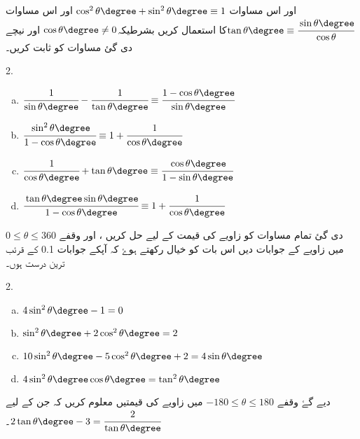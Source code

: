 \begin{enumerate}
                                                                                                                                                                                                                                                                                                                                                                                                                                                                                                                                   
\end{enumerate}

اور اس مساوات  \(\cos^2\theta\degree+\sin^2\theta\degree \equiv1\) اور اس مساوات \(\tan \theta\degree\equiv\cfrac{\sin\theta\degree}{\cos\theta}\)کا استعمال کریں بشرطیکہ\(\cos\theta\degree \neq 0 \) اور نیچے دی گئ مساوات کو ثابت کریں۔
\begin{multicols}{2.}
\begin{enumerate}[a.]
\item
\(\cfrac{1}{\sin\theta\degree}-\cfrac{1}{\tan\theta\degree}\equiv\cfrac{1-\cos\theta\degree}{\sin\theta\degree}\)
\item
 \(\cfrac{\sin^2\theta\degree}{1-\cos\theta\degree}\equiv 1+\cfrac{1}{\cos\theta\degree}\)
\item
\(\cfrac{1}{\cos\theta\degree}+\tan\theta\degree\equiv\cfrac{\cos\theta\degree}{1-\sin\theta\degree} \)
\item
\(\cfrac{\tan\theta\degree\sin\theta\degree}{1-\cos\theta\degree}\equiv1+\cfrac{1}{\cos\theta\degree} \)
\end{enumerate}
\end{multicols}
دی گئ تمام مساوات کو زاویے کی قیمت کے لیے حل کریں ، اور وقفے  \(  0\le \theta\le 360\) میں زاویے کے جوابات دیں اس بات کو خیال رکھتے ہوۓ کہ آپکے جوابات 0.1 کے قرئب ترین درست ہوں۔ 
\begin{multicols}{2.}
\begin{enumerate}[a.]
\item     \(4\sin^2\theta\degree-1=0\)
\item      \(\sin^2\theta\degree+2\cos^2\theta\degree=2 \)
\item \(10\sin^2\theta\degree-5\cos^2\theta\degree+2=4\sin\theta\degree \)
\item    \(4\sin^2\theta\degree\cos\theta\degree=\tan^2\theta\degree\)
\end{enumerate}
\end{multicols}
 دیے گۓ وقفے 
\(-180\le \theta\le 180\) میں   زاویے کی قیمتیں معلوم کریں کہ جن کے لیے  \(2\tan\theta\degree-3=\cfrac{2}{\tan\theta\degree}\)۔

